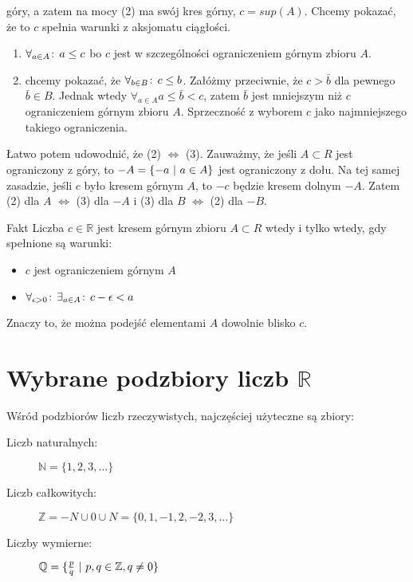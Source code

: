 \documentclass[9pt]{article}
\begin{document}
góry, a zatem na mocy (2) ma swój kres górny, $c = sup(A)$. Chcemy pokazać, że to $c$ spełnia
warunki z aksjomatu ciągłości.
\begin{enumerate}
    \item $\forall_{a \in A} \! : \, a \le c$ bo $c$ jest w szczególności ograniczeniem górnym
        zbioru $A$.
    \item chcemy pokazać, że $\forall_{b \in B} \! : \, c \le b$. Załóżmy przeciwnie, że $c >
        \bar{b}$ dla pewnego $\bar{b} \in B$. Jednak wtedy $\forall_{a \in A} a \le \bar{b} <
        c$, zatem $\bar{b}$ jest mniejszym niż $c$ ograniczeniem górnym zbioru $A$. Sprzeczność
        z wyborem $c$ jako najmniejszego takiego ograniczenia.
\end{enumerate}

Łatwo potem udowodnić, że (2) $\iff$ (3). Zauważmy, że jeśli $A \subset R$ jest ograniczony z
góry, to $-A = \{-a \ |\  a \in A\}$ jest ograniczony z dołu. Na tej samej zasadzie, jeśli $c$ było
kresem górnym $A$, to $-c$ będzie kresem dolnym $-A$. Zatem (2) dla $A$ $\iff$ (3) dla $-A$ i
(3) dla $B$ $\iff$ (2) dla $-B$.


Fakt
Liczba $c \in \mathbb{R}$ jest kresem górnym zbioru $A \subset R$ wtedy i tylko wtedy, gdy spełnione
są warunki:
\begin{itemize}
    \item $c$ jest ograniczeniem górnym $A$
    \item $\forall_{\epsilon > 0} \! : \, \exists_{a \in A} \! : \, c - \epsilon < a$
\end{itemize}
Znaczy to, że można podejść elementami $A$ dowolnie blisko $c$.


\section{Wybrane podzbiory liczb $\mathbb{R}$}

Wśród podzbiorów liczb rzeczywistych, najczęściej użyteczne są zbiory:

\begin{description}
    \item[Liczb naturalnych:] $\mathbb{N} = \{1, 2, 3, ...\}$
    \item[Liczb całkowitych:] $\mathbb{Z} = -N \cup {0} \cup N = \{0, 1, -1, 2, -2, 3, ...\}$
    \item[Liczby wymierne:] $\mathbb{Q} = \{\frac{p}{q} \ |\  p, q \in \mathbb{Z}, q \ne 0\}$
\end{description}
\end{document}
